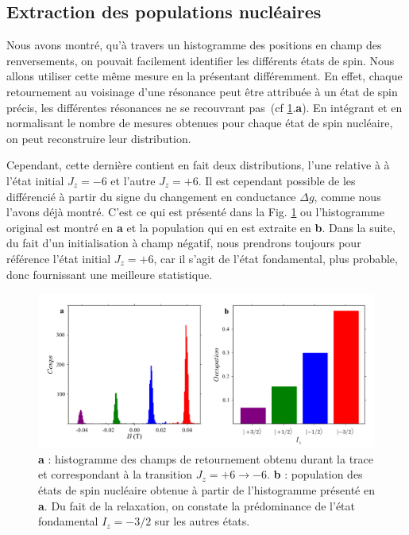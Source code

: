 \subsection{Extraction des populations nucléaires}
Nous avons montré, qu'à travers un histogramme des positions en champ des renversements, on pouvait facilement identifier les différents états de spin. Nous allons utiliser cette m\^eme mesure en la présentant différemment. En effet, chaque retournement au voisinage d'une résonance peut \^etre attribuée à un état de spin précis, les différentes résonances ne se recouvrant pas~(cf \ref{extract_pop}.\textbf{a}). En intégrant et en normalisant le nombre de mesures obtenues pour chaque état de spin nucléaire, on peut reconstruire leur distribution. 

Cependant, cette dernière contient en fait deux distributions, l'une relative à à l'état initial $J_z=-6$ et l'autre $J_z=+6$. Il est cependant possible de les différencié à partir du signe du changement en conductance $\Delta g$, comme nous l'avons déjà montré. C'est ce qui est présenté dans la Fig. \ref{extract_pop} ou l'histogramme original est montré en \textbf{a} et la population qui en est extraite en \textbf{b}. Dans la suite, du fait d'un initialisation à champ négatif, nous prendrons toujours pour référence l'état initial $J_z=+6$, car il s'agit de l'état fondamental, plus probable, donc fournissant une meilleure statistique.

\begin{figure}
\includegraphics[scale=0.45]{Resultats/PopState/PopState.pdf} 
\caption{\textbf{a} : histogramme des champs de retournement obtenu durant la trace et correspondant à la transition $J_z = +6 \rightarrow -6$. \textbf{b} : population des états de spin nucléaire obtenue à partir de l'histogramme présenté en \textbf{a}. Du fait de la relaxation, on constate la prédominance de l'état fondamental $I_z=-3/2$ sur les autres états.}
\label{extract_pop}
\end{figure}

